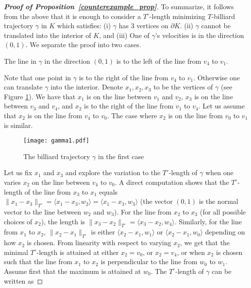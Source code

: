 \documentclass[10pt,a4paper]{article}
\theoremstyle{definition}
\begin{document}
\begin{proof}[{\bf Proof of Proposition~\ref{counterexample_prop}}]
To summarize, it follows from the above that %
it is enough to consider 
a $T^\circ$-length minimizing $T$-billiard trajectory $\gamma$ in $ K$ which satisfies: (i) 
$\gamma$ has 3 vertices on  $\partial K$. (ii) 
$\gamma$ cannot be translated into the interior of $K$, and (iii) One of $\gamma$'s velocities is in the direction $(0,1)$.
We separate the proof into two cases. 
\begin{center} \begin{it} The line in $\gamma$ in the direction $(0,1)$ is to the left of the line from $v_4$ to $v_1$.\end{it} \end{center} 
Note that one point in $\gamma$ is to the right of the line from $v_4$ to $v_1$. Otherwise one can translate $\gamma$ into the interior. Denote $x_1, x_2, x_3$ to be the vertices of $\gamma$ (see Figure \ref{gamma1Fig}).
We have that $x_1$ is on the line between $v_1$ and $v_2$, $x_3$ is on the line between $v_3$ and $v_4$, and $x_2$ is to the right of the line from $v_1$ to $v_4$. Let us assume that $x_2$ is on the line from $v_4$ to $v_0$. The case where $x_2$ is on the line from $v_0$ to $v_1$ is similar.
\begin{figure}[H]
\centering
\texttt{[image: gamma1.pdf]}
	 	\caption{The billiard trajectory $\gamma$ in the first case}
	 	\label{gamma1Fig}
\end{figure}
Let us fix $x_1$ and $x_3$ and %
explore the variation 
to the $T^\circ$-length of $\gamma$ when one varies $x_2$ on the line between $v_4$ to $v_0$.
A direct computation shows that the $T^\circ$-length of the line from $x_3$ to $x_1$ equals $\|x_1-x_3\|_{T^\circ} = \langle x_1 - x_3, w_2 \rangle = \langle x_1 - x_3, w_3 \rangle$ (the vector $(0,1)$ is the normal vector to the line between $w_2$ and $w_3$). 
For the line from $x_2$ to $x_3$ (for all possible choices of $x_2$), the length is $\|x_3 - x_2\|_{T^\circ} = \langle x_3 - x_2, w_4 \rangle$. Similarly, for the line from $x_1$ to $x_2$,  $\|x_2 - x_1\|_{T^\circ}$ is either $\langle x_2 - x_1, w_1 \rangle$ or $\langle x_2 - x_1, w_0 \rangle$ depending on how $x_2$ is chosen. 
From linearity with respect to varying $x_2$, we get that the minimal $T^\circ$-length is attained at either $x_2=v_0$, or $x_2=v_4$, or when $x_2$ is chosen such that the line from $x_1$ to $x_2$ is perpendicular to the line from $w_0$ to $w_1$. Assume first that the maximum is attained at $w_0$. The $T^\circ$-length of $\gamma$ can be written as

\end{proof}
\end{document}
